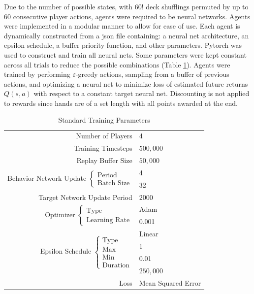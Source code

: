 \documentclass[10pt]{article} %
\begin{document}
Due to the number of possible states, with $60!$ deck shufflings permuted by up to $60$ consecutive player actions, agents were required to be neural networks. Agents were implemented in a modular manner to allow for ease of use. Each agent is dynamically constructed from a json file containing: a neural net architecture, an epsilon schedule, a buffer priority function, and other parameters. Pytorch was used to construct and train all neural nets. Some parameters were kept constant across all trials to reduce the possible combinations (Table \ref{tab:params}). Agents were trained by performing $\varepsilon$-greedy actions, sampling from a buffer of previous actions, and optimizing a neural net to minimize loss of estimated future returns $Q(s,a)$ with respect to a constant target neural net. Discounting is not applied to rewards since hands are of a set length with all points awarded at the end.

\begin{table}[h!]
\centering
\begin{tabular}{r|l}
Number of Players & 4 \\
Training Timesteps & $500,000$ \\
Replay Buffer Size & $50,000$ \\
\multirow{2}{*}{
Behavior Network Update
$\left\{\begin{matrix}
\text{Period} \\ \text{Batch Size}
\end{matrix}\right.$}
& 4 \\
& 32 \\
Target Network Update Period & 2000 \\
\multirow{2}{*}{
Optimizer
$\left\{\begin{matrix}
\text{Type} \\ \text{Learning Rate}
\end{matrix}\right.$}
& Adam \\
& 0.001 \\
\multirow{4}{*}{
Epsilon Schedule
$\left\{\begin{matrix}
\text{Type} \\ \text{Max} \\ \text{Min} \\ \text{Duration}
\end{matrix}\right.$}
& Linear \\
& 1 \\
& 0.01 \\
& $250,000$ \\
Loss & Mean Squared Error \\
\end{tabular}
\caption{Standard Training Parameters} \label{tab:params}
\end{table}
\end{document}
